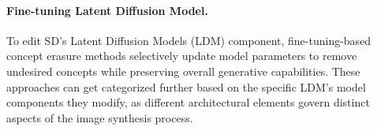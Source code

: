 


\paragraph{Fine-tuning  Latent Diffusion Model.}  To edit SD's Latent Diffusion Models (LDM) component, 
fine-tuning-based concept erasure methods selectively update model parameters to remove undesired concepts while preserving overall generative capabilities. These approaches can get categorized further based on the specific LDM's model components they modify, as different architectural elements govern distinct aspects of the image synthesis process.

